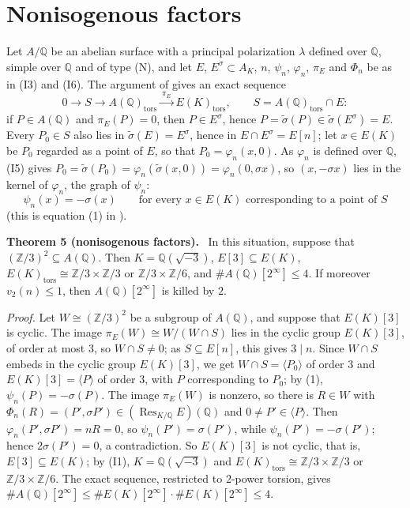 \documentclass[11pt]{article}
\newenvironment{statement}[1]{\par\medskip\noindent\phantomsection\textbf{#1}\ }{\par\medskip}
\newcommand{\Q}{\mathbb Q}
\newcommand{\Z}{\mathbb Z}
\DeclareMathOperator{\Res}{Res}
\begin{document}
\section{Nonisogenous factors}\label{typeN}

Let \(A/\Q\) be an abelian surface with a principal polarization \(\lambda\) defined over \(\Q\), simple over
\(\Q\) and of type (N), and let \(E\), \(E^\sigma\subset A_K\), \(n\), \(\psi_n\), \(\varphi_n\), \(\pi_E\) and
\(\Phi_n\) be as in (I3) and (I6). The argument of \cite[Proposition~2, step~1]{P2214} gives an exact sequence
\[0\to S\to A(\Q)_{\mathrm{tors}}\xrightarrow{\ \pi_E\ }E(K)_{\mathrm{tors}},\qquad S=A(\Q)_{\mathrm{tors}}\cap E:\]
if \(P\in A(\Q)\) and \(\pi_E(P)=0\), then \(P\in E^\sigma\), hence \(P=\tilde\sigma(P)\in\tilde\sigma(E^\sigma)=E\).
Every \(P_0\in S\) also lies in \(\tilde\sigma(E)=E^\sigma\), hence in \(E\cap E^\sigma=E[n]\); let \(x\in E(K)\) be \(P_0\) regarded as a point of \(E\), so that
\(P_0=\varphi_n(x,0)\). As \(\varphi_n\) is defined over \(\Q\), (I5) gives
\(P_0=\tilde\sigma(P_0)=\varphi_n(\tilde\sigma(x,0))=\varphi_n(0,\sigma x)\), so \((x,-\sigma x)\) lies in the kernel
of \(\varphi_n\), the graph of \(\psi_n\):
\[\psi_n(x)=-\sigma(x)\qquad\text{for every }x\in E(K)\text{ corresponding to a point of }S\tag{1}\]
(this is equation (1) in \cite[proof of Lemma~3]{P45}).

\begin{statement}{Theorem 5 (nonisogenous factors).}\label{thm-N}
In this situation, suppose that \((\Z/3)^2\subseteq A(\Q)\). Then \(K=\Q(\sqrt{-3})\), \(E[3]\subseteq E(K)\),
\(E(K)_{\mathrm{tors}}\cong\Z/3\times\Z/3\) or \(\Z/3\times\Z/6\), and \(\#A(\Q)[2^\infty]\le4\). If moreover
\(v_2(n)\le1\), then \(A(\Q)[2^\infty]\) is killed by \(2\).
\end{statement}

\emph{Proof.} Let \(W\cong(\Z/3)^2\) be a subgroup of \(A(\Q)\), and suppose that \(E(K)[3]\) is cyclic. The image
\(\pi_E(W)\cong W/(W\cap S)\) lies in the cyclic group \(E(K)[3]\), of order at most \(3\), so \(W\cap S\neq0\); as \(S\subseteq E[n]\), this gives \(3\mid n\).
Since \(W\cap S\) embeds in the cyclic group \(E(K)[3]\), we get \(W\cap S=\langle P_0\rangle\) of order \(3\) and
\(E(K)[3]=\langle P\rangle\) of order \(3\), with \(P\) corresponding to \(P_0\); by (1), \(\psi_n(P)=-\sigma(P)\).
The image \(\pi_E(W)\) is nonzero, so there is \(R\in W\) with \(\Phi_n(R)=(P',\sigma P')\in(\Res_{K/\Q}E)(\Q)\) and
\(0\neq P'\in\langle P\rangle\). Then \(\varphi_n(P',\sigma P')=nR=0\), so \(\psi_n(P')=\sigma(P')\), while
\(\psi_n(P')=-\sigma(P')\); hence \(2\sigma(P')=0\), a contradiction. So \(E(K)[3]\) is not cyclic, that is,
\(E[3]\subseteq E(K)\); by (I1), \(K=\Q(\sqrt{-3})\) and \(E(K)_{\mathrm{tors}}\cong\Z/3\times\Z/3\) or
\(\Z/3\times\Z/6\). The exact sequence, restricted to \(2\)-power torsion, gives
\(\#A(\Q)[2^\infty]\le\#E(K)[2^\infty]\cdot\#E(K)[2^\infty]\le4\).
\end{document}
